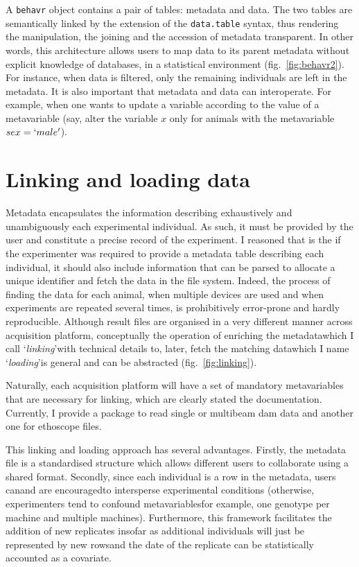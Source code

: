 

A \texttt{behavr} object contains a pair of tables: metadata and data.
The two tables are semantically linked by the extension of the \texttt{data.table} syntax, thus rendering the manipulation, the joining and the accession of metadata transparent.
In other words, this architecture allows users to map data to its parent metadata without explicit knowledge of databases, in a statistical environment (fig.~\ref{fig:behavr2}).
For instance, when  data is filtered, only the remaining individuals are left in the metadata. 
It is also important that metadata and data can interoperate.
For example, when one wants to update a variable according to the value of a metavariable (say, alter the variable $x$ only for animals with the metavariable $sex=`male'$).




\section{Linking and loading data}

Metadata encapsulates the information describing exhaustively and unambiguously each experimental individual.
As such, it must be provided by the user and constitute a precise record of the experiment.
I reasoned that is the if the experimenter was required to provide a metadata table describing each individual,
it should also include information that can be parsed to allocate a unique identifier and fetch the data in the file system.
Indeed, the process of finding the data for each animal, when multiple devices are used and when experiments are repeated several times, is prohibitively error-prone and hardly reproducible.
Although result files are organised in a very different manner across acquisition platform, conceptually
the operation of enriching the metadata\emd{}which I call `\emph{linking}'\emd{}with technical details to, later, fetch the matching data\emd{}which I name `\emph{loading}'\emd{}is general and can be abstracted (fig.~\ref{fig:linking}).



Naturally, each acquisition platform will have a set of mandatory metavariables that are necessary for linking, which are clearly stated the documentation.
Currently, I provide a package to read single or multibeam \gls{dam} data and another one for ethoscope files\cite{geissmann_ethoscopes_2017}.

This linking and loading approach has several advantages.
Firstly, the metadata file is a standardised structure which allows different users to collaborate using a shared format.
Secondly, since each individual is a row in the metadata, users can\emd{}and are encouraged\emd{}to intersperse experimental conditions (otherwise, experimenters tend to confound metavariables\emd{}for example, one genotype per machine and multiple machines).
Furthermore, this framework facilitates the addition of new replicates insofar as additional individuals will just be represented by new rows\emd{}and the date of the replicate can be statistically accounted as a covariate.

